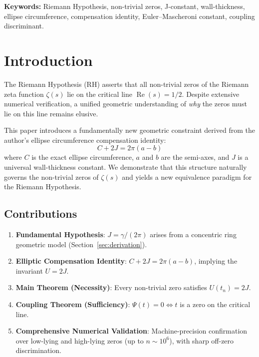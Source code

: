 \documentclass[11pt,a4paper]{article}
\theoremstyle{definition}
\begin{document}
\begin{titlepage}
\vspace{0.5cm}

\noindent\textbf{Keywords:} Riemann Hypothesis, non-trivial zeros, J-constant, wall-thickness, ellipse circumference, compensation identity, Euler--Mascheroni constant, coupling discriminant.

\end{titlepage}

\tableofcontents
\newpage

\section{Introduction}\label{sec:intro}

The Riemann Hypothesis (RH) asserts that all non-trivial zeros of the Riemann zeta function \(\zeta(s)\) lie on the critical line \(\operatorname{Re}(s) = 1/2\). 
Despite extensive numerical verification, a unified geometric understanding of \emph{why} the zeros must lie on this line remains elusive.

This paper introduces a fundamentally new geometric constraint derived from the author's ellipse circumference compensation identity:
\begin{equation}\label{eq:compensation}
C + 2J = 2\pi(a-b)
\end{equation}
where \(C\) is the exact ellipse circumference, \(a\) and \(b\) are the semi-axes, and \(J\) is a universal wall-thickness constant. 
We demonstrate that this structure naturally governs the non-trivial zeros of \(\zeta(s)\) and yields a new equivalence paradigm for the Riemann Hypothesis.

\subsection{Contributions}
\begin{enumerate}[leftmargin=2em]
    \item \textbf{Fundamental Hypothesis}: \(J = \gamma/(2\pi)\) arises from a concentric ring geometric model (Section~\ref{sec:derivation}).
    \item \textbf{Elliptic Compensation Identity}: \(C + 2J = 2\pi(a-b)\), implying the invariant \(U = 2J\).
    \item \textbf{Main Theorem (Necessity)}: Every non-trivial zero satisfies \(U(t_n) = 2J\).
    \item \textbf{Coupling Theorem (Sufficiency)}: \(\Psi(t) = 0 \iff t\) is a zero on the critical line.
    \item \textbf{Comprehensive Numerical Validation}: Machine-precision confirmation over low-lying and high-lying zeros (up to \(n \sim 10^6\)), with sharp off-zero discrimination.
\end{enumerate}
\end{document}
